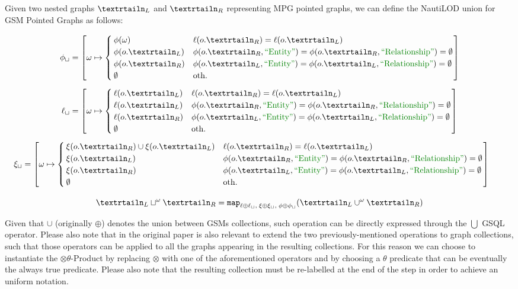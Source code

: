 \begin{definition}
	Given two nested graphs $\nested_L$ and $\nested_R$ representing MPG pointed graphs, we can define the NautiLOD  union for GSM  Pointed Graphs as follows:
	
	\[\phi_{\sqcup} = \left[\omega\mapsto \begin{cases}
	\phi(\omega) & \ell(o.\nested_R)=\ell(o.\nested_L)\\
	\phi(o.\nested_L) & \phi(o.\nested_R,\ONTA)=\phi(o.\nested_R,\RELA)=\emptyset\\
	\phi(o.\nested_R) & \phi(o.\nested_L,\ONTA)=\phi(o.\nested_L,\RELA)=\emptyset\\
	\emptyset & \textup{oth.}\\
	\end{cases}\right]\]
	\[\ell_\sqcup = \left[\omega\mapsto\begin{cases}
	\ell(o.\nested_L) & \ell(o.\nested_R)=\ell(o.\nested_L) \\
	\ell(o.\nested_L) & \phi(o.\nested_R,\ONTA)=\phi(o.\nested_R,\RELA)=\emptyset\\
	\ell(o.\nested_R) & \phi(o.\nested_L,\ONTA)=\phi(o.\nested_L,\RELA)=\emptyset\\
	\emptyset & \textup{oth.} \\
	\end{cases}\right]\]
	\[ \xi_\sqcup = \left[\omega\mapsto\begin{cases}
	\xi(o.\nested_R)\cup \xi(o.\nested_L) & \ell(o.\nested_R)=\ell(o.\nested_L) \\
	\xi(o.\nested_L) & \phi(o.\nested_R,\ONTA)=\phi(o.\nested_R,\RELA)=\emptyset\\
	\xi(o.\nested_R) & \phi(o.\nested_L,\ONTA)=\phi(o.\nested_L,\RELA)=\emptyset\\
	\emptyset & \textup{oth.} \\
	\end{cases}\right]\qquad\]
	
	
	\[\nested_L \sqcup^\omega \nested_R = \texttt{map}_{\ell\oplus \ell_\sqcup,\;\xi\oplus \xi_\sqcup,\;\phi\oplus \phi_\sqcup}(\nested_L \cup^\omega \nested_R)\] 
\end{definition}

Given that $\cup$ (originally $\oplus$) denotes the union between GSMs collections, such operation can be directly expressed through the $\bigcup$ GSQL operator.
Please also note that in the original paper is also relevant to extend the two previously-mentioned operations to graph collections, such that those operators can be applied to all the graphs appearing in the resulting collections. For this reason we can choose to instantiate the $\otimes\theta$-Product by replacing $\otimes$ with one of the aforementioned operators and by choosing a $\theta$ predicate that can be eventually the always true predicate. Please also note that the resulting collection must be re-labelled at the end of the step in order to achieve an uniform notation. 


